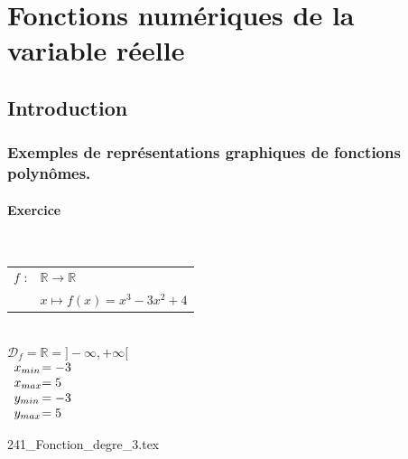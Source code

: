 \vspace*{-2cm}





\section{Fonctions numériques de la variable réelle}

\subsection{Introduction}

\subsubsection{Exemples de représentations graphiques de fonctions polynômes.}

\paragraph{Exercice }%
~\\
 
\begin{tabular}{l@{$\;$ }l}
$f$ : & $ \mathbb{R} \longrightarrow \mathbb{R}$\\
      & $ x \longmapsto f(x) = x^3 -3x^2 +4$\\
\end{tabular}\\

$\mathscr{D}_f = \mathbb{R} = ] -\infty, +\infty [ $ \\

$
\begin{array}{l@{}l}
          x_{min} &= -3 \\
          x_{max} &= 5  \\
          y_{min} &= -3 \\
          y_{max} &= 5  \\
\end{array}
$

\vspace*{-2cm}
\centerline{ {241_Fonction_degre_3.tex} }

